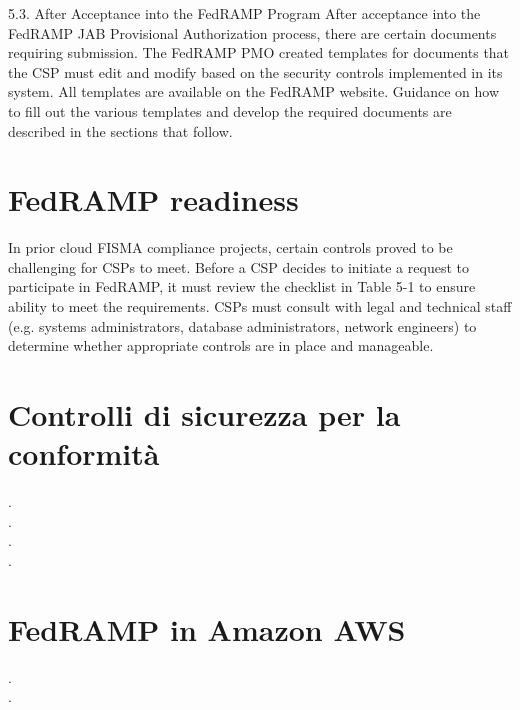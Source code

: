 \documentclass[../main.tex]{subfiles}
\begin{document}
5.3. After Acceptance into the FedRAMP Program
After acceptance into the FedRAMP JAB Provisional Authorization process, there are certain documents requiring submission.  The FedRAMP PMO created templates for documents that the CSP must edit and modify based on the security controls implemented in its system.  All templates are available on the FedRAMP website.  Guidance on how to fill out the various templates and develop the required documents are described in the sections that follow.  




\section{FedRAMP readiness}

In prior cloud FISMA compliance projects, certain controls proved to be challenging for CSPs to meet.  Before a CSP decides to initiate a request to participate in FedRAMP, it must review the checklist in Table 5-1 to ensure ability to meet the requirements.  CSPs must consult with legal and technical staff (e.g.  systems administrators, database administrators, network engineers) to determine whether appropriate controls are in place and manageable.


\section{Controlli di sicurezza per la conformità}
.\\\newpage
.\\\newpage
.\\\newpage
.\\\newpage
\section{FedRAMP in Amazon AWS}
.\\\newpage
.\\\newpage
\end{document}
